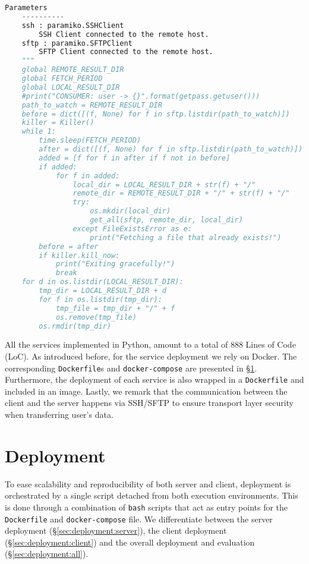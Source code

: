 \begin{enumerate}
\begin{lstlisting}[language=Python,caption={Snippet illustrating the remote filesystem monitoring in the \texttt{consumer} service.},label=code:consumer-short]
    Parameters
    ----------
    ssh : paramiko.SSHClient
        SSH Client connected to the remote host.
    sftp : paramiko.SFTPClient
        SFTP Client connected to the remote host.
    """
    global REMOTE_RESULT_DIR
    global FETCH_PERIOD
    global LOCAL_RESULT_DIR
    #print("CONSUMER: user -> {}".format(getpass.getuser()))
    path_to_watch = REMOTE_RESULT_DIR
    before = dict([(f, None) for f in sftp.listdir(path_to_watch)])
    killer = Killer()
    while 1:
        time.sleep(FETCH_PERIOD)
        after = dict([(f, None) for f in sftp.listdir(path_to_watch)])
        added = [f for f in after if f not in before]
        if added:
            for f in added:
                local_dir = LOCAL_RESULT_DIR + str(f) + "/"
                remote_dir = REMOTE_RESULT_DIR + "/" + str(f) + "/"
                try:
                    os.mkdir(local_dir)
                    get_all(sftp, remote_dir, local_dir)
                except FileExistsError as e:
                    print("Fetching a file that already exists!")
        before = after
        if killer.kill_now:
            print("Exiting gracefully!")
            break
    for d in os.listdir(LOCAL_RESULT_DIR):
        tmp_dir = LOCAL_RESULT_DIR + d
        for f in os.listdir(tmp_dir):
            tmp_file = tmp_dir + "/" + f
            os.remove(tmp_file)
        os.rmdir(tmp_dir)
\end{lstlisting}
\end{enumerate}
All the services implemented in Python, amount to a total of $888$ Lines of Code (LoC). 
As introduced before, for the service deployment we rely on Docker.
The corresponding \texttt{Dockerfile}s and \texttt{docker-compose} are presented in \S\ref{sec:deployment}.
Furthermore, the deployment of each service is also wrapped in a \texttt{Dockerfile} and included in an image.
Lastly, we remark that the communication between the client and the server happens via SSH/SFTP to ensure transport layer security when transferring user's data.

\section{Deployment} \label{sec:deployment}

To ease scalability and reproducibility of both server and client, deployment is orchestrated by a single script detached from both execution environments. 
This is done through a combination of \texttt{bash} scripts that act as entry points for the \texttt{Dockerfile} and \texttt{docker-compose} file.
We differentiate between the server deployment (\S\ref{sec:deployment:server}), the client deployment (\S\ref{sec:deployment:client}) and the overall deployment and evaluation (\S\ref{sec:deployment:all}).

